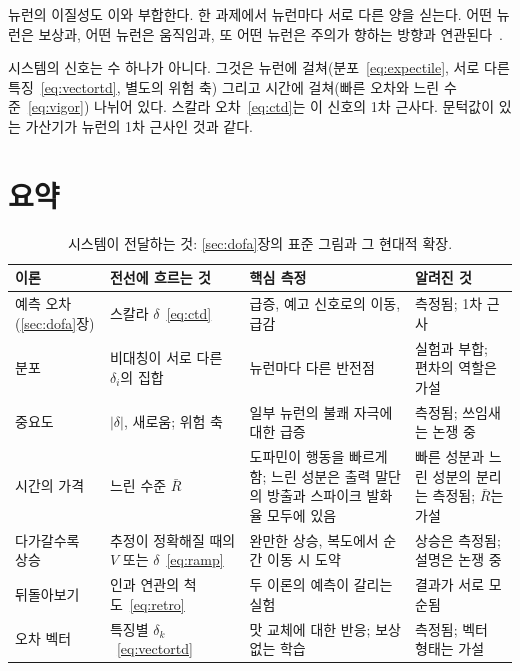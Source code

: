  뉴런의 이질성도 이와 부합한다. 한 과제에서 뉴런마다 서로 다른 양을 싣는다. 어떤 뉴런은 보상과, 어떤 뉴런은 움직임과, 또 어떤 뉴런은 주의가 향하는 방향과 연관된다~\cite{Engelhard2019}.

\begin{keyblock}
\begin{proposition}[전선 대신 다발]
\label{prop:bundle}
 시스템의 신호는 수 하나가 아니다. 그것은 뉴런에 걸쳐(분포~\eqref{eq:expectile}, 서로 다른 특징~\eqref{eq:vectortd}, 별도의 위험 축) 그리고 시간에 걸쳐(빠른 오차와 느린 수준~\eqref{eq:vigor}) 나뉘어 있다. 스칼라 오차~\eqref{eq:ctd}는 이 신호의 1차 근사다. 문턱값이 있는 가산기가 뉴런의 1차 근사인 것과 같다.
\end{proposition}
\end{keyblock}

\section{요약}

\begin{table}[t]
\centering
\footnotesize
\setlength{\tabcolsep}{4pt}
\renewcommand{\arraystretch}{1.15}
\begin{tabular}{>{\raggedright}p{2.5cm}>{\raggedright}p{3.2cm}>{\raggedright}p{3.6cm}>{\raggedright\arraybackslash}p{4.2cm}}
\toprule
이론 & 전선에 흐르는 것 & 핵심 측정 & 알려진 것 \\
\midrule
예측 오차(\ref{sec:dofa}장) & 스칼라 $\delta$~\eqref{eq:ctd} & 급증, 예고 신호로의 이동, 급감 & 측정됨; 1차 근사 \\
분포 & 비대칭이 서로 다른 $\delta_i$의 집합 & 뉴런마다 다른 반전점 & 실험과 부합; 편차의 역할은 가설 \\
중요도 & $|\delta|$, 새로움; 위험 축 & 일부 뉴런의 불쾌 자극에 대한 급증 & 측정됨; 쓰임새는 논쟁 중 \\
시간의 가격 & 느린 수준 $\bar R$ & 도파민이 행동을 빠르게 함; 느린 성분은 출력 말단의 방출과 스파이크 발화율 모두에 있음 & 빠른 성분과 느린 성분의 분리는 측정됨; $\bar R$는 가설 \\
다가갈수록 상승 & 추정이 정확해질 때의 $V$ 또는 $\delta$~\eqref{eq:ramp} & 완만한 상승, 복도에서 순간 이동 시 도약 & 상승은 측정됨; 설명은 논쟁 중 \\
뒤돌아보기 & 인과 연관의 척도~\eqref{eq:retro} & 두 이론의 예측이 갈리는 실험 & 결과가 서로 모순됨 \\
오차 벡터 & 특징별 $\delta_k$~\eqref{eq:vectortd} & 맛 교체에 대한 반응; 보상 없는 학습 & 측정됨; 벡터 형태는 가설 \\
\bottomrule
\end{tabular}
\caption{ 시스템이 전달하는 것: \ref{sec:dofa}장의 표준 그림과 그 현대적 확장.}
\label{tab:dofaalt}
\end{table}

